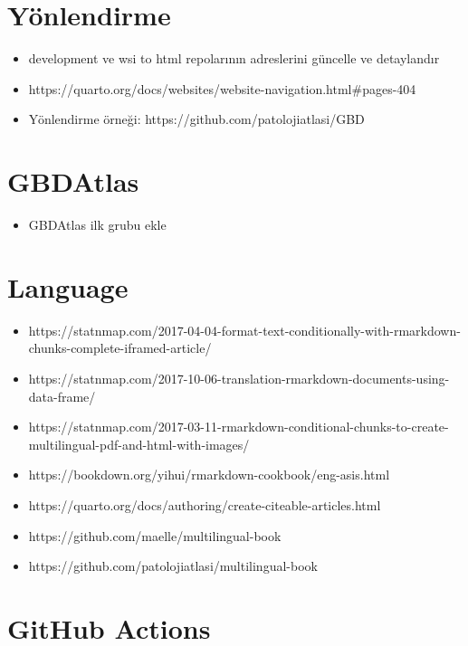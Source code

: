 \documentclass[
  letterpaper,
  DIV=11,
  numbers=noendperiod]{scrreprt}
\providecommand{\tightlist}{%
  \setlength{\itemsep}{0pt}\setlength{\parskip}{0pt}}\usepackage{longtable,booktabs,array}
\begin{document}
\hypertarget{yuxf6nlendirme}{%
\section{Yönlendirme}\label{yuxf6nlendirme}}

\begin{itemize}
\tightlist
\item
  development ve wsi to html repolarının adreslerini güncelle ve
  detaylandır
\item
  https://quarto.org/docs/websites/website-navigation.html\#pages-404
\item
  Yönlendirme örneği: https://github.com/patolojiatlasi/GBD
\end{itemize}

\hypertarget{gbdatlas}{%
\section{GBDAtlas}\label{gbdatlas}}

\begin{itemize}
\tightlist
\item
  GBDAtlas ilk grubu ekle
\end{itemize}

\hypertarget{language}{%
\section{Language}\label{language}}

\begin{itemize}
\tightlist
\item
  https://statnmap.com/2017-04-04-format-text-conditionally-with-rmarkdown-chunks-complete-iframed-article/
\item
  https://statnmap.com/2017-10-06-translation-rmarkdown-documents-using-data-frame/
\item
  https://statnmap.com/2017-03-11-rmarkdown-conditional-chunks-to-create-multilingual-pdf-and-html-with-images/
\item
  https://bookdown.org/yihui/rmarkdown-cookbook/eng-asis.html
\item
  https://quarto.org/docs/authoring/create-citeable-articles.html
\item
  https://github.com/maelle/multilingual-book
\item
  https://github.com/patolojiatlasi/multilingual-book
\end{itemize}

\hypertarget{github-actions}{%
\section{GitHub Actions}\label{github-actions}}
\end{document}
